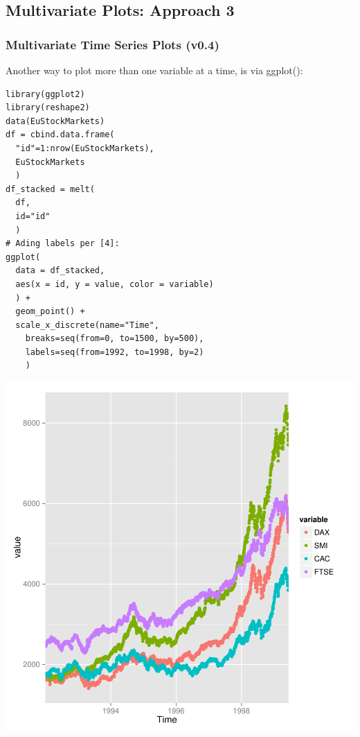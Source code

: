 \subsection{Multivariate Plots: Approach 3}
\begin{frame}
 \frametitle{Multivariate Time Series Plots (v0.4)}

Another way to plot more than one variable at a time, is via \ttfamily ggplot()\normalfont :
		\begin{lstlisting}
library(ggplot2)
library(reshape2)   
data(EuStockMarkets)
df = cbind.data.frame(
  "id"=1:nrow(EuStockMarkets),
  EuStockMarkets
  )
df_stacked = melt(
  df,
  id="id"
  )
# Ading labels per [4]:
ggplot(
  data = df_stacked,
  aes(x = id, y = value, color = variable)
  ) +
  geom_point() +
  scale_x_discrete(name="Time",
    breaks=seq(from=0, to=1500, by=500),
    labels=seq(from=1992, to=1998, by=2)
    )
		\end{lstlisting}

       \begin{center}
         \includegraphics[scale=0.4]{images/stockPlot2.pdf}
        \end{center}
\end{frame}
%

